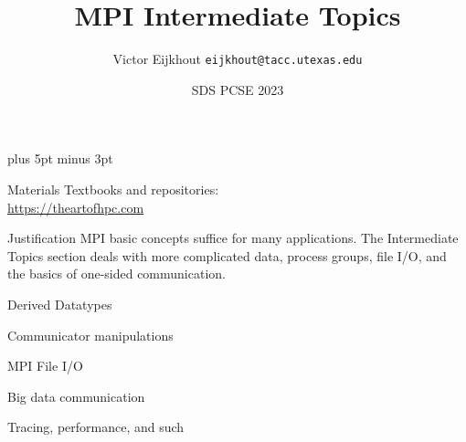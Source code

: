 \documentclass[11pt,headernav]{beamer}
\def\Location{}%
\def\courseyear{2023}
\def\Location{SDS PCSE \courseyear}
\def\TitleExtra{}
\begin{document}
\parskip=10pt plus 5pt minus 3pt

\title{MPI Intermediate Topics\TitleExtra}
\author{Victor Eijkhout {\tt eijkhout@tacc.utexas.edu}}
\date{\Location}

\begin{frame}
  \titlepage
\end{frame}

\begin{frame}[containsverbatim]{Materials}
    Textbooks and repositories:\\
    \url{https://theartofhpc.com}
\end{frame}



\renewcommand\standardversion{}

\begin{frame}{Justification}
  MPI basic concepts suffice for many applications.  The Intermediate
  Topics section deals with more complicated data, process groups,
  file I/O, and the basics of one-sided communication.
\end{frame}

 {Derived Datatypes}


 {Communicator manipulations}


 {MPI File I/O}


 {Big data communication}



 {Tracing, performance, and such}

\end{document}
